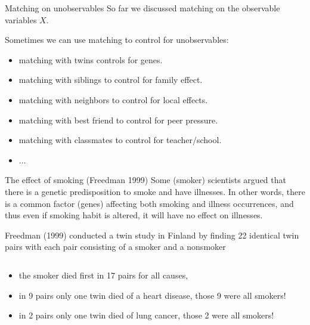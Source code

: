 \documentclass[handout]{beamer}
\begin{document}
\begin{frame}{Matching on unobservables}
	So far we discussed matching on the observable variables $X$.\bigskip
	
	Sometimes we can use matching to control for unobservables:
	\begin{itemize}
		\item matching with twins controls for genes.
		\item matching with siblings to control for family effect.
		\item matching with neighbors to control for local effects.
		\item matching with best friend to control for peer pressure.
		\item matching with classmates to control for teacher/school.
		\item $\dots$
	\end{itemize}
\end{frame}



\begin{frame}{The effect of smoking (Freedman 1999)}
Some (smoker) scientists argued that there is a genetic predisposition to smoke and have illnesses. 
In other words, there is a common factor (genes) affecting both smoking and illness occurrences, and thus even
if smoking habit is altered, it will have no effect on illnesses.\bigskip

Freedman (1999) conducted a twin study in Finland by finding 22 identical twin pairs with
each pair consisting of a smoker and a nonsmoker\pause
\begin{columns}
	\begin{column}{0.99\textwidth}
		\begin{itemize}
			\item the smoker died first in 17 pairs for all causes,
			\item in 9 pairs only one twin died of a heart disease, those 9 were all smokers!
			\item in 2 pairs only one twin died of lung cancer, those 2 were all smokers!
		\end{itemize}
	\end{column}
\end{columns}


\end{frame}
\end{document}

